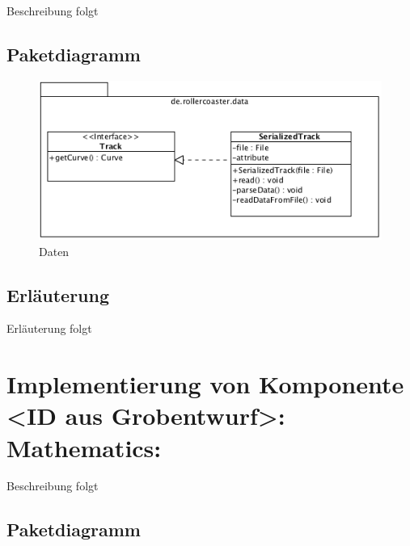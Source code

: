Beschreibung folgt

\subsection{Paketdiagramm}

\begin{figure}
\includegraphics[width=\linewidth]{bilder/Data}
\caption{Daten}
\end{figure}

\subsection{Erläuterung}

Erläuterung folgt

\section{Implementierung von Komponente
         <ID aus Grobentwurf>: Mathematics:}

Beschreibung folgt

\subsection{Paketdiagramm}

